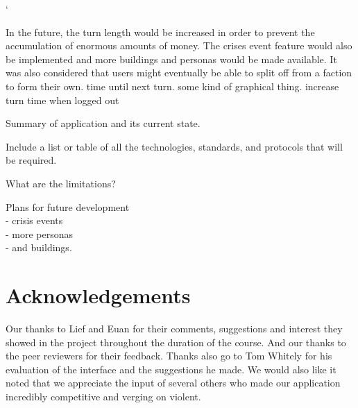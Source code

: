 `\documentclass{sig-alt-release2}
\begin{document}
In the future, the turn length would be increased in order to prevent the accumulation of enormous amounts of money. The crises event feature would also be implemented and more buildings and personas would be made available. It was also considered that users might eventually be able to split off from a faction to form their own. time until next turn. some kind of graphical thing. increase turn time when logged out

Summary of application and its current state.

Include a list or table of all the technologies, standards, and protocols that will be required.

What are the limitations?

Plans for future development \\
- crisis events\\
- more personas\\
- and buildings.\\

\section{Acknowledgements}
Our thanks to Lief and Euan for their comments, suggestions and interest they showed in the project throughout the duration of the course. And our thanks to the peer reviewers for their feedback.
Thanks also go to Tom Whitely for his evaluation of the interface and the suggestions he made.
We would also like it noted that we appreciate the input of several others who made our application incredibly competitive and verging on violent.



\end{document}
